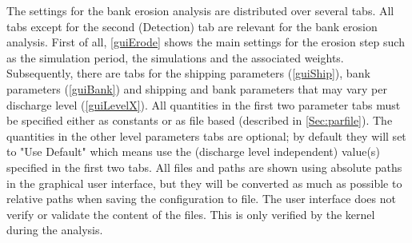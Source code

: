 

The settings for the bank erosion analysis are distributed over several tabs.
All tabs except for the second (Detection) tab are relevant for the bank erosion analysis.
First of all, \autoref{guiErode} shows the main settings for the erosion step such as the simulation period, the simulations and the associated weights.
Subsequently, there are tabs for the shipping parameters (\autoref{guiShip}), bank parameters (\autoref{guiBank}) and shipping and bank parameters that may vary per discharge level (\autoref{guiLevelX}).
All quantities in the first two parameter tabs must be specified either as constants or as file based (described in \autoref{Sec:parfile}).
The quantities in the other level parameters tabs are optional; by default they will set to "Use Default" which means use the (discharge level independent) value(s) specified in the first two tabs.
All files and paths are shown using absolute paths in the graphical user interface, but they will be converted as much as possible to relative paths when saving the configuration to file.
The user interface does not verify or validate the content of the files.
This is only verified by the kernel during the analysis.


